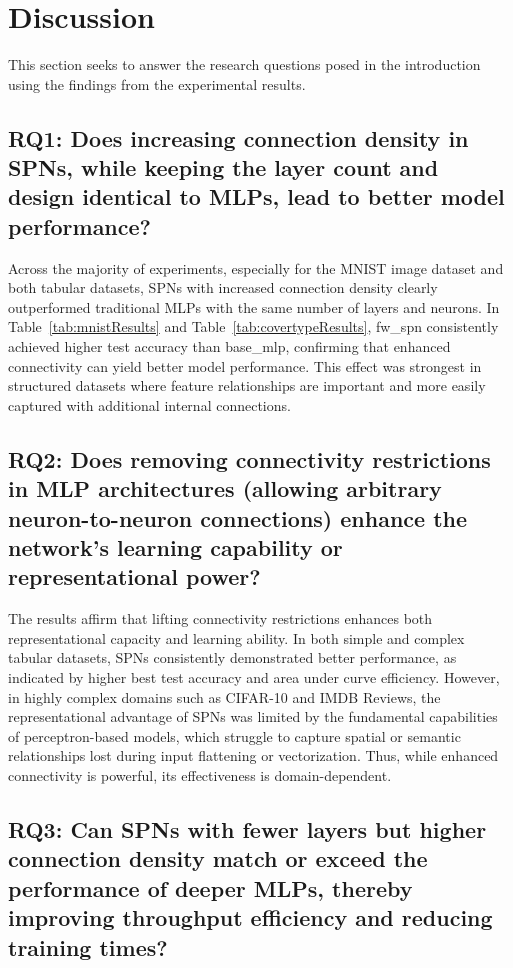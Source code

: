 \section{Discussion}

This section seeks to answer the research questions posed in the introduction using the findings from the experimental results.

\subsection*{RQ1: Does increasing connection density in SPNs, while keeping the layer count and design identical to MLPs, lead to better model performance?}

Across the majority of experiments, especially for the MNIST image dataset and both tabular datasets, SPNs with increased connection density clearly outperformed traditional MLPs with the same number of layers and neurons. In Table~\ref{tab:mnistResults} and Table~\ref{tab:covertypeResults}, fw\_spn consistently achieved higher test accuracy than base\_mlp, confirming that enhanced connectivity can yield better model performance. This effect was strongest in structured datasets where feature relationships are important and more easily captured with additional internal connections.

\subsection*{RQ2: Does removing connectivity restrictions in MLP architectures (allowing arbitrary neuron-to-neuron connections) enhance the network’s learning capability or representational power?}

The results affirm that lifting connectivity restrictions enhances both representational capacity and learning ability. In both simple and complex tabular datasets, SPNs consistently demonstrated better performance, as indicated by higher best test accuracy and area under curve efficiency. However, in highly complex domains such as CIFAR-10 and IMDB Reviews, the representational advantage of SPNs was limited by the fundamental capabilities of perceptron-based models, which struggle to capture spatial or semantic relationships lost during input flattening or vectorization. Thus, while enhanced connectivity is powerful, its effectiveness is domain-dependent.

\subsection*{RQ3: Can SPNs with fewer layers but higher connection density match or exceed the performance of deeper MLPs, thereby improving throughput efficiency and reducing training times?}


